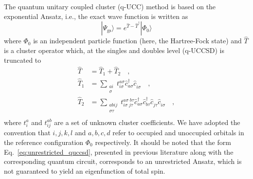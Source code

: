 \documentclass[aps,pra,onecolumn]{revtex4-2}
\newcommand{\crt}[1]{\hat{c}_{#1}^\dagger}
\newcommand{\dst}[1]{\hat{c}_{#1}^{\phantom{\dagger}}}
\begin{document}
The quantum unitary coupled cluster (q-UCC) method is based on the exponential Ansatz, i.e., the exact wave function is written as
\begin{equation}
| \Psi_{\mathrm{gs}} \rangle = e^{ \hat{T} - \hat{T}^\dagger } | \Phi_0 \rangle
\end{equation}
where $\Phi_0$ is an independent particle function (here, the Hartree-Fock state) and $\hat{T}$ is a cluster operator which, 
at the singles and doubles level (q-UCCSD) is truncated to
\begin{equation}
\label{eq:unrestricted_quccsd}
\begin{split}
\hat{T} &= \hat{T}_1 + \hat{T}_2 \quad, \\
\hat{T}_1 &= \sum_{\substack{ai \\ \sigma}} t^{a \sigma}_{i \sigma} \crt{a \sigma} \dst{i \sigma} \quad,\\
\hat{T}_2 &= \sum_{\substack{abij \\ \sigma\tau}} t^{a\sigma \; b\tau}_{i\sigma \; j\tau} \crt{a \sigma} \crt{b \tau} \dst{j \tau} \dst{i \sigma} \quad,\\
\end{split}
\end{equation}
where $t^{a}_i$ and $t^{ab}_{ij}$ are a set of unknown cluster coefficients. We have adopted the convention that $i,j,k,l$ and $a,b,c,d$
refer to occupied and unoccupied orbitals in the reference configuration $\Phi_0$ respectively.
It should be noted that the form Eq.~\eqref{eq:unrestricted_quccsd}, presented in previous literature along with the corresponding quantum circuit,
corresponds to an unrestricted Ansatz, which is not guaranteed to yield an eigenfunction of total spin.
\end{document}
